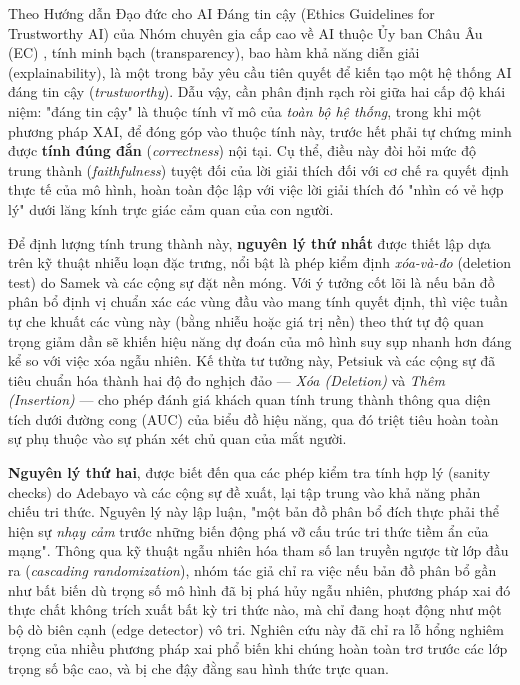 Theo Hướng dẫn Đạo đức cho AI Đáng tin cậy (Ethics Guidelines for Trustworthy AI) của Nhóm chuyên gia cấp cao về AI thuộc Ủy ban Châu Âu (EC) \cite{eu2019trustworthy}, tính minh bạch (transparency), bao hàm khả năng diễn giải (explainability), là một trong bảy yêu cầu tiên quyết để kiến tạo một hệ thống AI đáng tin cậy (\emph{trustworthy}). Dẫu vậy, cần phân định rạch ròi giữa hai cấp độ khái niệm: "đáng tin cậy" là thuộc tính vĩ mô của \emph{toàn bộ hệ thống}, trong khi một phương pháp XAI, để đóng góp vào thuộc tính này, trước hết phải tự chứng minh được \textbf{tính đúng đắn} (\emph{correctness}) nội tại. Cụ thể, điều này đòi hỏi mức độ trung thành (\emph{faithfulness}) tuyệt đối của lời giải thích đối với cơ chế ra quyết định thực tế của mô hình, hoàn toàn độc lập với việc lời giải thích đó "nhìn có vẻ hợp lý" dưới lăng kính trực giác cảm quan của con người.

Để định lượng tính trung thành này, \textbf{nguyên lý thứ nhất} được thiết lập dựa trên kỹ thuật nhiễu loạn đặc trưng, nổi bật là phép kiểm định \emph{xóa-và-đo} (deletion test) do Samek và các cộng sự \cite{samek2016evaluating} đặt nền móng. Với ý tưởng cốt lõi là nếu bản đồ phân bổ định vị chuẩn xác các vùng đầu vào mang tính quyết định, thì việc tuần tự che khuất các vùng này (bằng nhiễu hoặc giá trị nền) theo thứ tự độ quan trọng giảm dần sẽ khiến hiệu năng dự đoán của mô hình suy sụp nhanh hơn đáng kể so với việc xóa ngẫu nhiên. Kế thừa tư tưởng này, Petsiuk và các cộng sự \cite{petsiuk2018rise} đã tiêu chuẩn hóa thành hai độ đo nghịch đảo — \emph{Xóa (Deletion)} và \emph{Thêm (Insertion)} — cho phép đánh giá khách quan tính trung thành thông qua diện tích dưới đường cong (AUC) của biểu đồ hiệu năng, qua đó triệt tiêu hoàn toàn sự phụ thuộc vào sự phán xét chủ quan của mắt người.

\textbf{Nguyên lý thứ hai}, được biết đến qua các phép kiểm tra tính hợp lý (sanity checks) do Adebayo và các cộng sự \cite{adebayo2018sanity} đề xuất, lại tập trung vào khả năng phản chiếu tri thức. Nguyên lý này lập luận, "một bản đồ phân bổ đích thực phải thể hiện sự \emph{nhạy cảm} trước những biến động phá vỡ cấu trúc tri thức tiềm ẩn của mạng". Thông qua kỹ thuật ngẫu nhiên hóa tham số lan truyền ngược từ lớp đầu ra (\emph{cascading randomization}), nhóm tác giả chỉ ra việc nếu bản đồ phân bổ gần như bất biến dù trọng số mô hình đã bị phá hủy ngẫu nhiên, phương pháp \acrshort{xai} đó thực chất không trích xuất bất kỳ tri thức nào, mà chỉ đang hoạt động như một bộ dò biên cạnh (edge detector) vô tri. Nghiên cứu này đã chỉ ra lỗ hổng nghiêm trọng của nhiều phương pháp \acrshort{xai} phổ biến khi chúng hoàn toàn trơ trước các lớp trọng số bậc cao, và bị che đậy đằng sau hình thức trực quan.

